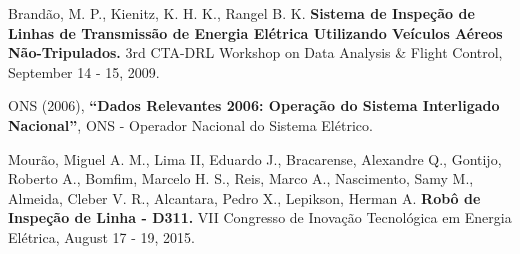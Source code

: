 \begin{thebibliography}{999}
Brandão, M. P., Kienitz, K. H. K., Rangel B. K. {\bf Sistema de Inspeção de Linhas de Transmissão de Energia Elétrica Utilizando Veículos Aéreos Não-Tripulados.} 3rd CTA-DRL Workshop on Data Analysis & Flight Control, September 14 - 15, 2009.

ONS (2006), {\bf “Dados Relevantes 2006: Operação do Sistema Interligado Nacional”}, ONS - Operador Nacional do Sistema Elétrico.

Mourão, Miguel A. M., Lima II, Eduardo J., Bracarense, Alexandre Q., Gontijo, Roberto A., Bomfim, Marcelo H. S., Reis, Marco A., Nascimento, Samy M., Almeida, Cleber V. R., Alcantara, Pedro X., Lepikson, Herman A. 
{\bf Robô de Inspeção de Linha - D311.}
 VII Congresso de Inovação Tecnológica em Energia Elétrica, August 17 - 19, 2015.
 
\end{thebibliography}




